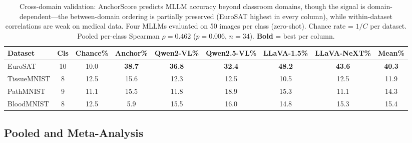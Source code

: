 \documentclass[11pt,a4paper]{article}
\begin{document}
\begin{table}[t]
\caption{Cross-domain validation: AnchorScore predicts MLLM accuracy beyond classroom domains, though the signal is domain-dependent---the between-domain ordering is partially preserved (EuroSAT highest in every column), while within-dataset correlations are weak on medical data. Four MLLMs evaluated on 50 images per class (zero-shot). Chance rate = $1/C$ per dataset. Pooled per-class Spearman $\rho=0.462$ ($p=0.006$, $n=34$). \textbf{Bold} = best per column.}
\label{tab:cross_mllm}
\centering
\footnotesize
\setlength{\tabcolsep}{3.5pt}
\begin{tabular}{lcccccccc}
\toprule
\textbf{Dataset} & \textbf{Cls} & \textbf{Chance\%} & \textbf{Anchor\%} & \textbf{Qwen2-VL\%} & \textbf{Qwen2.5-VL\%} & \textbf{LLaVA-1.5\%} & \textbf{LLaVA-NeXT\%} & \textbf{Mean\%} \\
\midrule
EuroSAT & 10 & 10.0 & \textbf{38.7} & \textbf{36.8} & \textbf{32.4} & \textbf{48.2} & \textbf{43.6} & \textbf{40.3} \\
TissueMNIST & 8 & 12.5 & 15.6 & 12.3 & 12.5 & 10.5 & 12.5 & 11.9 \\
PathMNIST & 9 & 11.1 & 15.5 & 11.8 & 18.9 & 15.3 & 11.1 & 14.3 \\
BloodMNIST & 8 & 12.5 & 5.9 & 15.5 & 16.0 & 14.8 & 15.3 & 15.4 \\
\bottomrule
\end{tabular}
\end{table}

\subsection{Pooled and Meta-Analysis}
\label{sec:pooled_meta}
\end{document}
